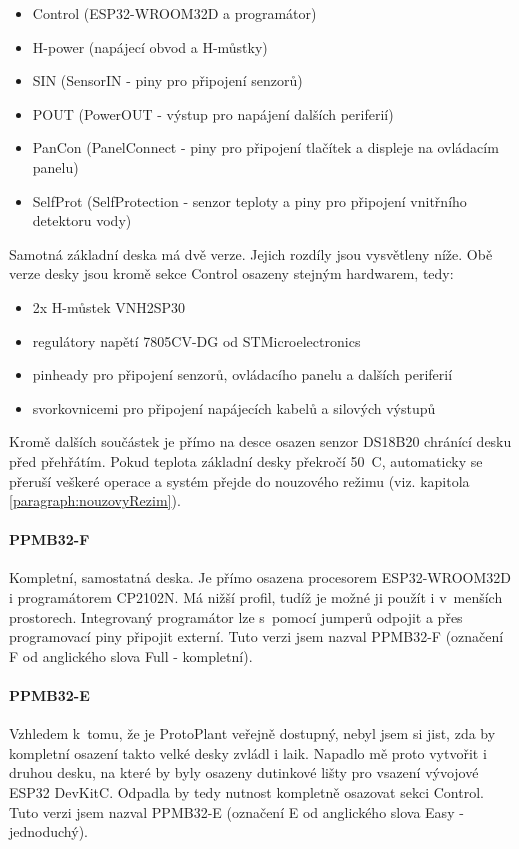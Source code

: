 \begin{itemize}
    \item Control (ESP32-WROOM32D a programátor)
    \item H-power (napájecí obvod a H-můstky)
    \item SIN (SensorIN - piny pro připojení senzorů)
    \item POUT (PowerOUT - výstup pro napájení dalších periferií)
    \item PanCon (PanelConnect - piny pro připojení tlačítek a displeje na ovládacím panelu)
    \item SelfProt (SelfProtection - senzor teploty a piny pro připojení vnitřního detektoru vody)
\end{itemize} 

Samotná základní deska má dvě verze. Jejich rozdíly jsou vysvětleny níže.
Obě verze desky jsou kromě sekce Control osazeny stejným hardwarem, tedy:

\begin{itemize}
    \item 2x H-můstek VNH2SP30
    \item regulátory napětí 7805CV-DG od STMicroelectronics
    \item pinheady pro připojení senzorů, ovládacího panelu a dalších periferií
    \item svorkovnicemi pro připojení napájecích kabelů a silových výstupů
\end{itemize}

Kromě dalších součástek je přímo na desce osazen senzor DS18B20 chránící desku před přehřátím. 
Pokud teplota základní desky překročí 50~\degree C, automaticky se přeruší veškeré operace a systém přejde do nouzového režimu (viz. kapitola \ref{paragraph:nouzovyRezim}).

\paragraph{PPMB32-F}
Kompletní, samostatná deska. 
Je přímo osazena procesorem ESP32-WROOM32D i programátorem CP2102N. 
Má nižší profil, tudíž je možné ji použít i v~menších prostorech.
Integrovaný programátor lze s~pomocí jumperů odpojit a přes programovací piny připojit externí. Tuto verzi jsem nazval PPMB32-F (označení F od anglického slova Full - kompletní).

\paragraph{PPMB32-E}
Vzhledem k~tomu, že je ProtoPlant veřejně dostupný, nebyl jsem si jist, zda by kompletní osazení takto velké desky zvládl i laik. 
Napadlo mě proto vytvořit i druhou desku, na které by byly osazeny dutinkové lišty pro vsazení vývojové ESP32 DevKitC. 
Odpadla by tedy nutnost kompletně osazovat sekci Control. 
Tuto verzi jsem nazval PPMB32-E (označení E od anglického slova Easy - jednoduchý).

